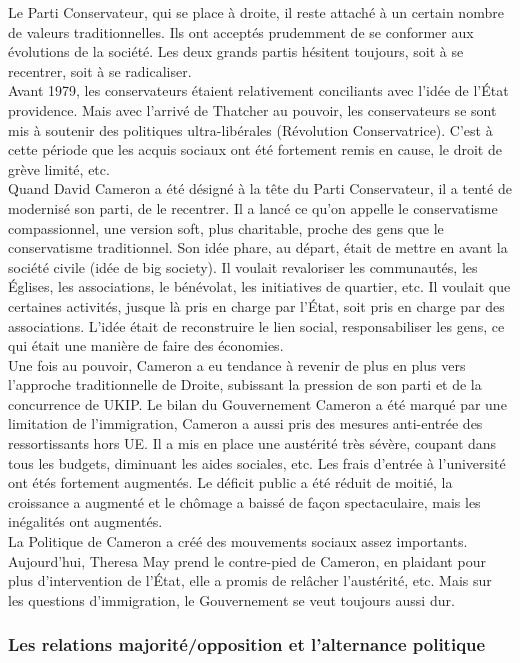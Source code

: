 \documentclass[10pt, a4paper, openany]{book}
\begin{document}
Le Parti Conservateur, qui se place à droite, il reste attaché à un certain nombre de valeurs traditionnelles. Ils ont acceptés prudemment de se conformer aux évolutions de la société. Les deux grands partis hésitent toujours, soit à se recentrer, soit à se radicaliser. \\
Avant 1979, les conservateurs étaient relativement conciliants avec l'idée de l'État providence. Mais avec l'arrivé de Thatcher au pouvoir, les conservateurs se sont mis à soutenir des politiques ultra-libérales (Révolution Conservatrice). C'est à cette période que les acquis sociaux ont été fortement remis en cause, le droit de grève limité, etc. \\
Quand David Cameron a été désigné à la tête du Parti Conservateur, il a tenté de modernisé son parti, de le recentrer. Il a lancé ce qu'on appelle le conservatisme compassionnel, une version soft, plus charitable, proche des gens que le conservatisme traditionnel. Son idée phare, au départ, était de mettre en avant la société civile (idée de big society). Il voulait revaloriser les communautés, les Églises, les associations, le bénévolat, les initiatives de quartier, etc. Il voulait que certaines activités, jusque là pris en charge par l'État, soit pris en charge par des associations. L'idée était de reconstruire le lien social, responsabiliser les gens, ce qui était une manière de faire des économies. \\
Une fois au pouvoir, Cameron a eu tendance à revenir de plus en plus vers l'approche traditionnelle de Droite, subissant la pression de son parti et de la concurrence de UKIP. Le bilan du Gouvernement Cameron a été marqué par une limitation de l'immigration, Cameron a aussi pris des mesures anti-entrée des ressortissants hors UE. Il a mis en place une austérité très sévère, coupant dans tous les budgets, diminuant les aides sociales, etc. Les frais d'entrée à l'université ont étés fortement augmentés. Le déficit public a été réduit de moitié, la croissance a augmenté et le chômage a baissé de façon spectaculaire, mais les inégalités ont augmentés. \\
La Politique de Cameron a créé des mouvements sociaux assez importants. Aujourd'hui, Theresa May prend le contre-pied de Cameron, en plaidant pour plus d'intervention de l'État, elle a promis de relâcher l'austérité, etc. Mais sur les questions d'immigration, le Gouvernement se veut toujours aussi dur. 

\subsubsection{Les relations majorité/opposition et l'alternance politique}
\end{document}
